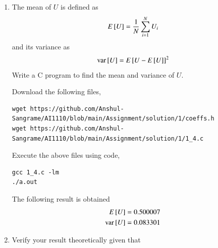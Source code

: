 \documentclass[journal,12pt,twocolumn]{IEEEtran}
\renewcommand\thesection{\arabic{section}}
\begin{document}
\begin{enumerate}[label=\thesection.\arabic*
,ref=\thesection.\theenumi]
\solution 

Pdf of Uniform distribution between [0,1] is given by,
\begin{align}
    f_U(x) = \begin{cases}
        1, & x \in [0,1] \\
        0, & \text{otherwise}
    \end{cases}
\end{align}
\begin{align}
    F_U(x) = \int_{-\infty}^{x} f_U(x) dx
\end{align}
Case-1: x $<$ 0,
\begin{align}
    F_U(x) &= \int_{-\infty}^{x} 0 dx \\
    &= 0
\end{align}
Case-2: x $\in$ [0,1],
\begin{align}
    F_U(x) &= \int_{-\infty}^{0} 0 dx + \int_{0}^{x} 1 dx\\
    &= x
\end{align}\
Case-3: x $>$ 1,
\begin{align}
    F_U(x) &= \int_{-\infty}^{0} 0 dx + \int_{0}^{1} 1 dx + \int_{1}^{x} 0 dx\\
    &= 1
\end{align}
Hence,
\begin{align}
    F_U(x) = \begin{cases}
    0, & x < 0 \\
    x, & x \in [0,1] \\
    1, & x > 1
    \end{cases}
\end{align}
%
\item
The mean of $U$ is defined as
%
\begin{equation}
E{}\left[U\right] = \frac{1}{N}\sum_{i=1}^{N}U_i
	\label{eq:mean-form}
\end{equation}
%
and its variance as
%
\begin{equation}
\text{var}{}\left[U\right] = E{}\left[U- E{}\left[U\right]\right]^2 
	\label{eq:var-form}
\end{equation}
Write a C program to  find the mean and variance of $U$.

\solution 

Download the following files,
\begin{lstlisting}
wget https://github.com/Anshul-Sangrame/AI1110/blob/main/Assignment/solution/1/coeffs.h
wget https://github.com/Anshul-Sangrame/AI1110/blob/main/Assignment/solution/1/1_4.c
\end{lstlisting}
Execute the above files using code,
\begin{lstlisting}
gcc 1_4.c -lm
./a.out
\end{lstlisting}
The following result is obtained
\begin{align*}
    E{}\left[U\right] &= 0.500007 \\
    \text{var}{}\left[U\right] &= 0.083301
\end{align*}
%
\item Verify your result theoretically given that
\end{enumerate}
\end{document}
